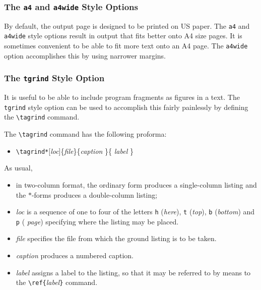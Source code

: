 \subsubsection{The {\tt a4} and {\tt a4wide} Style Options}

By default, the output page is designed to be printed on US paper.
The {\tt a4} and {\tt a4wide} style options result in output
that fits better onto A4 size pages.
It is sometimes convenient to be able to fit more text onto an A4 page.
The {\tt a4wide} option accomplishes this by using narrower margins.

\subsubsection{The {\tt tgrind} Style Option}{\label{tagrind}}

It is useful to be able to include program fragments as figures in a
text.  The {\tt tgrind} style option can be used to accomplish this
fairly painlessly by defining the \verb|\tagrind| command. 

The \verb|\tagrind| command has the following proforma:
\begin{itemize} \tt
\item[]
\verb|\tagrind*|[{\it loc\/}]\{{\it file\/}\}\{{\it caption \/}\}\{{\it 
label \/}\}
\end{itemize}

As usual,
\begin{itemize}
\item in two-column format, the ordinary form produces a
single-column listing and the $\ast$-forms produces a double-column listing;

\item {\it loc\/}
is a sequence of one to four of the letters \verb|h| ({\it here\/}),
\verb|t| ({\it top\/}), \verb|b| ({\it bottom\/}) and \verb|p| ({\it
page\/}) specifying where the listing may be placed. 

\item {\it file} specifies the file from which the ground listing
is to be taken.

\item {\it caption} produces a numbered caption.

\item {\it label} assigns a label to the listing, so that it may be
referred to by means to the \verb|\ref{|{\it label\/}\verb|}| command.

\end{itemize}

